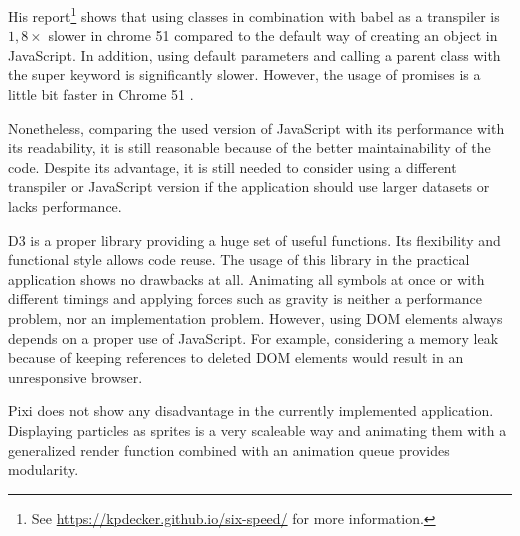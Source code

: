 His report\footnote{See \href{https://kpdecker.github.io/six-speed/}{https://kpdecker.github.io/six-speed/} for more information.} shows that using classes in combination with babel as a transpiler is $1,8\times$ slower in chrome 51 compared to the default way of creating an object in JavaScript. In addition, using default parameters and calling a parent class with the super keyword is significantly slower. However, the usage of promises is a little bit faster in Chrome 51 .

Nonetheless, comparing the used version of JavaScript with its performance with its readability, it is still reasonable because of the better maintainability of the code. Despite its advantage, it is still needed to consider using a different transpiler or JavaScript version if the application should use larger datasets or lacks performance.

\ac{D3} is a proper library providing a huge set of useful functions. Its flexibility and functional style allows code reuse. The usage of this library in the practical application shows no drawbacks at all. Animating all symbols at once or with different timings and applying forces such as gravity is neither a performance problem, nor an implementation problem. However, using \ac{DOM} elements always depends on a proper use of JavaScript. For example, considering a memory leak because of keeping references to deleted \ac{DOM} elements would result in an unresponsive browser.

\ac{Pixi} does not show any disadvantage in the currently implemented application. Displaying particles as sprites is a very scaleable way and animating them with a generalized render function combined with an animation queue provides modularity.